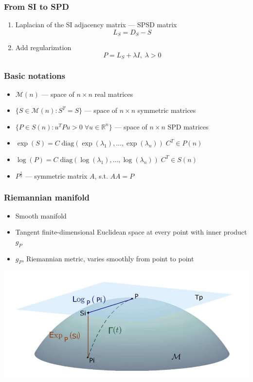 \documentclass{beamer}
\begin{document}
\begin{frame}
\frametitle{From SI to SPD}
\begin{enumerate}
	\item Laplacian of the SI adjacency matrix  --- SPSD matrix
	\begin{equation*}
	L_S = D_S - S
	\end{equation*}
	\vfill
		\item Add regularization
		\begin{equation*}
		P  = L_{S} + \lambda I, \; \lambda > 0
		\end{equation*}
\end{enumerate}

\end{frame}



\begin{frame}
\frametitle{Basic notations}
\begin{itemize}
	\item $\mathcal{M}(n)$ --- space of $n\times n$ real matrices
	\vfill
	\item $\{S \in \mathcal{M}(n): S^T = S  \}$ --- space of $n\times n$ symmetric matrices
		\vfill
	\item $\{P \in S(n): u^TPu > 0 \; \forall u \in \mathbb{R}^n  \}$ --- space of $n\times n$ SPD matrices
		\vfill
	\item $\exp(S) = C\; \text{diag}(\exp(\lambda_1), \dots, \exp(\lambda_n) ) \; C^T  \in P(n)$
		\vfill
	\item $\log(P) = C\; \text{diag}(\log(\lambda_1), \dots, \log(\lambda_n) ) \; C^T \in S(n)$
		\vfill
	\item $P^{\frac12}$ --- symmetric matrix $A$, s.t. $AA = P$
\end{itemize}

\end{frame}


\begin{frame}
\frametitle{Riemannian manifold}
\begin{itemize}
\item Smooth manifold
\item Tangent finite-dimensional Euclidean space at every point with inner product $g_P$
\item $g_P$, Riemannian metric, varies smoothly from point to point
\end{itemize}
 \hfill \includegraphics[scale=0.5]{manifold.png}
\end{frame}
\end{document}
